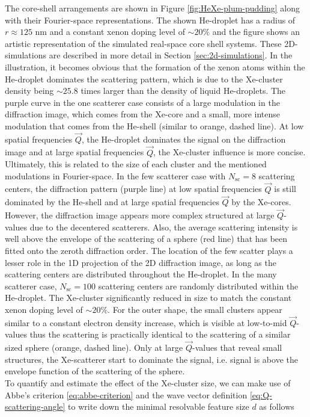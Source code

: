 The core-shell arrangements are shown in Figure \ref{fig:HeXe-plum-pudding} along with their Fourier-space representations. The shown He-droplet has a radius of $r\approx 125$ nm and a constant xenon doping level of $\sim 20\%$ and the figure shows an artistic representation of the simulated real-space core shell systems. These 2D-simulations are described in more detail in Section \ref{sec:2d-simulations}. In the illustration, it becomes obvious that the formation of the xenon atoms within the He-droplet dominates the scattering pattern, which is due to the Xe-cluster density being $\sim 25.8$ times larger than the density of liquid He-droplets. The purple curve in the one scatterer case consists of a large modulation in the diffraction image, which comes from the Xe-core and a small, more intense modulation that comes from the He-shell (similar to orange, dashed line). At low spatial frequencies $\vec{Q}$, the He-droplet dominates the signal on the diffraction image and at large spatial frequencies $\vec{Q}$, the Xe-cluster influence is more concise. Ultimately, this is related to the size of each cluster and the mentioned modulations in Fourier-space. In the few scatterer case with $N_{\text{sc}}=8$ scattering centers, the diffraction pattern (purple line) at low spatial frequencies $\vec{Q}$ is still dominated by the He-shell and at large spatial frequencies $\vec{Q}$ by the Xe-cores. However, the diffraction image appears more complex structured at large $\vec{Q}$-values due to the decentered scatterers. Also, the average scattering intensity is well above the envelope of the scattering of a sphere (red line) that has been fitted onto the zeroth diffraction order. The location of the few scatter plays a lesser role in the 1D projection of the 2D diffraction image, as long as the scattering centers are distributed throughout the He-droplet. In the many scatterer case, $N_{\text{sc}}=100$ scattering centers are randomly distributed within the He-droplet. The Xe-cluster significantly reduced in size to match the constant xenon doping level of $\sim 20 \%$. For the outer shape, the small clusters appear similar to a constant electron density increase, which is visible at low-to-mid $\vec{Q}$-values thus the scattering is practically identical to the scattering of a similar sized sphere (orange, dashed line). Only at large $\vec{Q}$-values that reveal small structures, the Xe-scatterer start to dominate the signal, i.e. signal is above the envelope function of the scattering of the sphere.\\
To quantify and estimate the effect of the Xe-cluster size, we can make use of Abbe's criterion \eqref{eq:abbe-criterion} and the wave vector definition \eqref{eq:Q-scattering-angle} to write down the minimal resolvable feature size $d$ as follows
